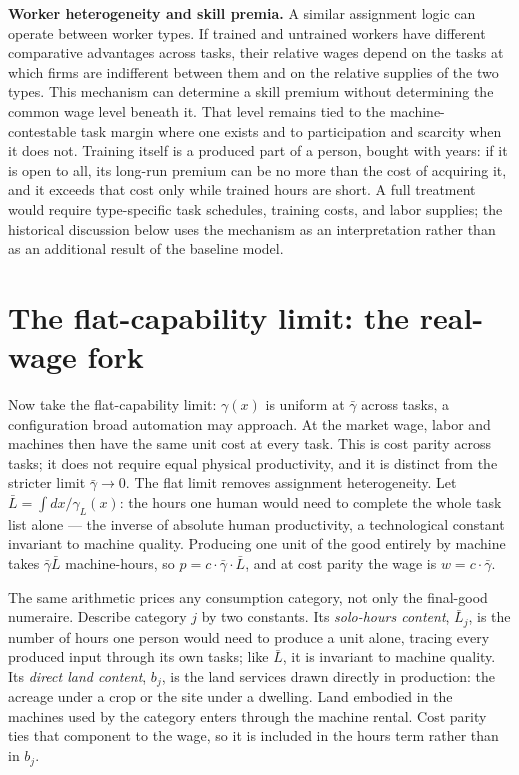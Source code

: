 \documentclass[12pt]{article}
\theoremstyle{plain}
\begin{document}
\textbf{Worker heterogeneity and skill premia.}
A similar assignment logic can operate between worker types. If trained and
untrained workers have different comparative advantages across tasks, their
relative wages depend on the tasks at which firms are indifferent between
them and on the relative supplies of the two types. This mechanism can
determine a skill premium without determining the common wage level beneath
it. That level remains tied to the machine-contestable task margin where one
exists and to participation and scarcity when it does not. Training itself is
a produced part of a person, bought with years: if it is open to all, its
long-run premium can be no more than the cost of acquiring it, and it exceeds
that cost only while trained hours are short. A full treatment would require
type-specific task schedules, training costs, and labor supplies; the
historical discussion below uses the mechanism as an interpretation rather
than as an additional result of the baseline model.

\section{The flat-capability limit: the real-wage fork}\label{sec:limit}

Now take the flat-capability limit: $\gamma(x)$ is uniform at $\bar{\gamma}$ across tasks, a configuration broad automation may approach. At the market wage, labor and machines then have the same unit cost at every task. This is cost parity across tasks; it does not require equal physical productivity, and it is distinct from the stricter limit $\bar{\gamma}\to0$. The flat limit removes assignment heterogeneity. Let $\bar{L} = \int dx/\gamma _L(x)$: the hours one human would need to complete the whole task list alone --- the inverse of absolute human productivity, a technological constant invariant to machine quality. Producing one unit of the good entirely by machine takes $\bar{\gamma}\bar{L}$ machine-hours, so $p = c\cdot \bar{\gamma}\cdot \bar{L}$, and at cost parity the wage is $w = c\cdot \bar{\gamma}$.

The same arithmetic prices any consumption category, not only the final-good numeraire. Describe category $j$ by two constants. Its \emph{solo-hours content}, $\bar{L}_j$, is the number of hours one person would need to produce a unit alone, tracing every produced input through its own tasks; like $\bar{L}$, it is invariant to machine quality. Its \emph{direct land content}, $b_j$, is the land services drawn directly in production: the acreage under a crop or the site under a dwelling. Land embodied in the machines used by the category enters through the machine rental. Cost parity ties that component to the wage, so it is included in the hours term rather than in $b_j$.
\end{document}

